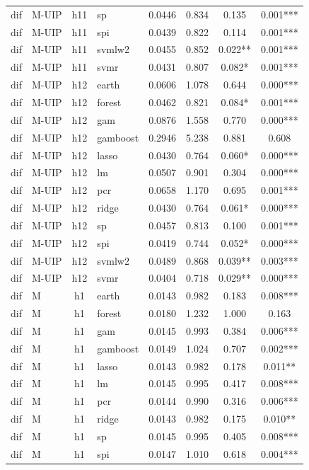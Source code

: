 \begin{ThreePartTable}
\begin{longtable}[t]{llclcccc}
dif & M-UIP & h11 & sp & 0.0446 & 0.834 & 0.135 & 0.001***\\
dif & M-UIP & h11 & spi & 0.0439 & 0.822 & 0.114 & 0.001***\\
dif & M-UIP & h11 & svmlw2 & 0.0455 & 0.852 & 0.022** & 0.001***\\
dif & M-UIP & h11 & svmr & 0.0431 & 0.807 & 0.082* & 0.001***\\
\addlinespace
dif & M-UIP & h12 & earth & 0.0606 & 1.078 & 0.644 & 0.000***\\
dif & M-UIP & h12 & forest & 0.0462 & 0.821 & 0.084* & 0.001***\\
dif & M-UIP & h12 & gam & 0.0876 & 1.558 & 0.770 & 0.000***\\
dif & M-UIP & h12 & gamboost & 0.2946 & 5.238 & 0.881 & 0.608\\
dif & M-UIP & h12 & lasso & 0.0430 & 0.764 & 0.060* & 0.000***\\
dif & M-UIP & h12 & lm & 0.0507 & 0.901 & 0.304 & 0.000***\\
dif & M-UIP & h12 & pcr & 0.0658 & 1.170 & 0.695 & 0.001***\\
dif & M-UIP & h12 & ridge & 0.0430 & 0.764 & 0.061* & 0.000***\\
dif & M-UIP & h12 & sp & 0.0457 & 0.813 & 0.100 & 0.001***\\
dif & M-UIP & h12 & spi & 0.0419 & 0.744 & 0.052* & 0.000***\\
dif & M-UIP & h12 & svmlw2 & 0.0489 & 0.868 & 0.039** & 0.003***\\
dif & M-UIP & h12 & svmr & 0.0404 & 0.718 & 0.029** & 0.000***\\
\addlinespace
dif & M & h1 & earth & 0.0143 & 0.982 & 0.183 & 0.008***\\
dif & M & h1 & forest & 0.0180 & 1.232 & 1.000 & 0.163\\
dif & M & h1 & gam & 0.0145 & 0.993 & 0.384 & 0.006***\\
dif & M & h1 & gamboost & 0.0149 & 1.024 & 0.707 & 0.002***\\
dif & M & h1 & lasso & 0.0143 & 0.982 & 0.178 & 0.011**\\
dif & M & h1 & lm & 0.0145 & 0.995 & 0.417 & 0.008***\\
dif & M & h1 & pcr & 0.0144 & 0.990 & 0.316 & 0.006***\\
dif & M & h1 & ridge & 0.0143 & 0.982 & 0.175 & 0.010**\\
dif & M & h1 & sp & 0.0145 & 0.995 & 0.405 & 0.008***\\
dif & M & h1 & spi & 0.0147 & 1.010 & 0.618 & 0.004***\\

\end{longtable}
\end{ThreePartTable}
